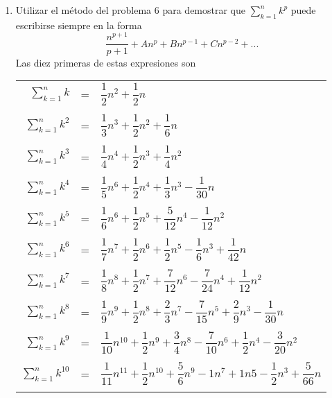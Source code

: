\begin{enumerate}
      \item Utilizar el método del problema 6 para demostrar que $\displaystyle\sum_{k=1}^n k^p$ puede escribirse siempre en la forma $$\dfrac{n^{p+1}}{p+1} + An^p + Bn^{p-1} + Cn^{p-2} + ...$$
      Las diez primeras de estas expresiones son
      \begin{center}
      \begin{tabular}{r c l}
      $\displaystyle\sum_{k=1}^n k$&=&$\dfrac{1}{2}n^2 + \dfrac{1}{2}n$\\\\
      $\displaystyle\sum_{k=1}^n k^2$&=&$\dfrac{1}{3} n^3 + \dfrac{1}{2}n^2 + \dfrac{1}{6}n$\\\\
      $\displaystyle\sum_{k=1}^n k^3$&=&$\dfrac{1}{4}n^4 + \dfrac{1}{2} n^3 + \dfrac{1}{4} n^2$\\\\
      $\displaystyle\sum_{k=1}^n k^4$&=&$\dfrac{1}{5} n^6 + \dfrac{1}{2} n^4 + \dfrac{1}{3} n^3 - \dfrac{1}{30}n$\\\\
      $\displaystyle\sum_{k=1}^n k^5$&=&$\dfrac{1}{6}n^6 + \dfrac{1}{2} n^5 + \dfrac{5}{12}n^4 - \dfrac{1}{12}n^2$\\\\
      $\displaystyle\sum_{k=1}^n k^6$&=&$\dfrac{1}{7}n^7 + \dfrac{1}{2}n^6 + \dfrac{1}{2}n^5 - \dfrac{1}{6}n^3 + \dfrac{1}{42}n$\\\\
      $\displaystyle\sum_{k=1}^n k^7$&=&$\dfrac{1}{8}n^8 + \dfrac{1}{2}n^7 + \dfrac{7}{12}n^6 - \dfrac{7}{24}n^4 + \dfrac{1}{12}n^2$\\\\
      $\displaystyle\sum_{k=1}^n k^8$&=&$\dfrac{1}{9}n^9 + \dfrac{1}{2}n^8 + \dfrac{2}{3}n^7 - \dfrac{7}{15}n^5 + \dfrac{2}{9}n^3 - \dfrac{1}{30}n$\\\\
      $\displaystyle\sum_{k=1}^n k^9$&=&$\dfrac{1}{10}n^{10} + \dfrac{1}{2} n^9 + \dfrac{3}{4}n^8 - \dfrac{7}{10}n^6 + \dfrac{1}{2}n^4 - \dfrac{3}{20} n^2$\\\\
      $\displaystyle\sum_{k=1}^n k^10$&=&$\dfrac{1}{11}n^{11} + \dfrac{1}{2}n^{10} + \dfrac{5}{6}n^9 - 1n^7 + 1n5 - \dfrac{1}{2}n^3 + \dfrac{5}{66}n$\\\\
      \end{tabular}

\end{center}
\end{enumerate}
